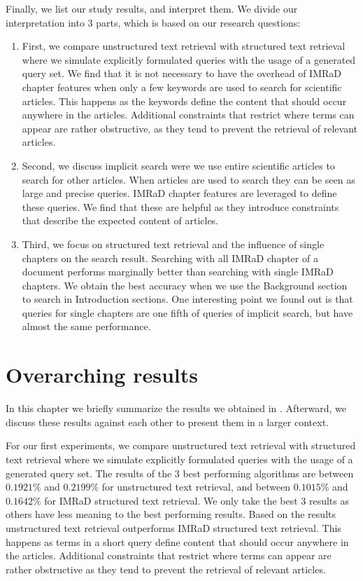 Finally, we list our study results, and interpret them. We divide our interpretation into $3$ parts, which is based on our research questions:
\begin{enumerate}[label=(\alph*)]
  \item First, we compare unstructured text retrieval with structured text retrieval where we simulate explicitly formulated queries with the usage of a generated query set. We find that it is not necessary to have the overhead of IMRaD chapter features when only a few keywords are used to search for scientific articles. This happens as the keywords define the content that should occur anywhere in the articles. Additional constraints that restrict where terms can appear are rather obstructive, as they tend to prevent the retrieval of relevant articles.
  \item Second, we discuss implicit search were we use entire scientific articles to search for other articles. When articles are used to search they can be seen as large and precise queries. IMRaD chapter features are leveraged to define these queries. We find that these are helpful as they introduce constraints that describe the expected content of articles.
  \item Third, we focus on structured text retrieval and the influence of single chapters on the search result. Searching with all IMRaD chapter of a document performs marginally better than searching with single IMRaD chapters. We obtain the best accuracy when we use the Background section to search in Introduction sections. One interesting point we found out is that queries for single chapters are one fifth of queries of implicit search, but have almost the same performance.
\end{enumerate}

\section{Overarching results}
\label{sec:overarching_results}

In this chapter we briefly summarize the results we obtained in . Afterward, we discuss these results against each other to present them in a larger context.

For our first experiments, we compare unstructured text retrieval with structured text retrieval where we simulate explicitly formulated queries with the usage of a generated query set. The results of the $3$ best performing algorithms are between $0.1921\%$ and $0.2199\%$ for unstructured text retrieval, and between $0.1015\%$ and $0.1642\%$ for IMRaD structured text retrieval. We only take the best $3$ results as others have less meaning to the best performing results. Based on the results unstructured text retrieval outperforms IMRaD structured text retrieval. This happens as terms in a short query define content that should occur anywhere in the articles. Additional constraints that restrict where terms can appear are rather obstructive as they tend to prevent the retrieval of relevant articles.

